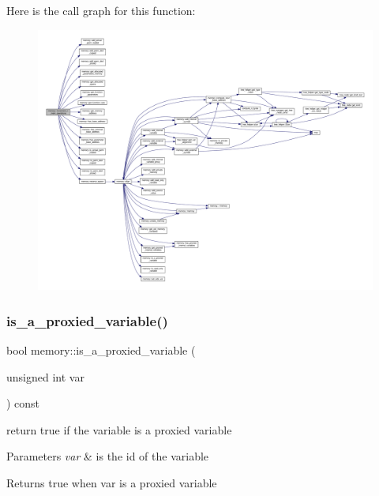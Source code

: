 Here is the call graph for this function\+:
\nopagebreak
\begin{figure}[H]
\begin{center}
\leavevmode
\includegraphics[width=350pt]{d8/d99/classmemory_a7115d45a81bee175e0e55a71ea92d3d9_cgraph}
\end{center}
\end{figure}
\mbox{\label{classmemory_ad42c0543068efe731b71267f869fefcf}} 
\subsubsection{\texorpdfstring{is\+\_\+a\+\_\+proxied\+\_\+variable()}{is\_a\_proxied\_variable()}}
{\footnotesize\ttfamily bool memory\+::is\+\_\+a\+\_\+proxied\+\_\+variable (\begin{DoxyParamCaption}\item[{unsigned int}]{var }\end{DoxyParamCaption}) const}



return true if the variable is a proxied variable 


\begin{DoxyParams}{Parameters}
{\em var} & is the id of the variable \\
\hline
\end{DoxyParams}
\begin{DoxyReturn}{Returns}
true when var is a proxied variable 
\end{DoxyReturn}


